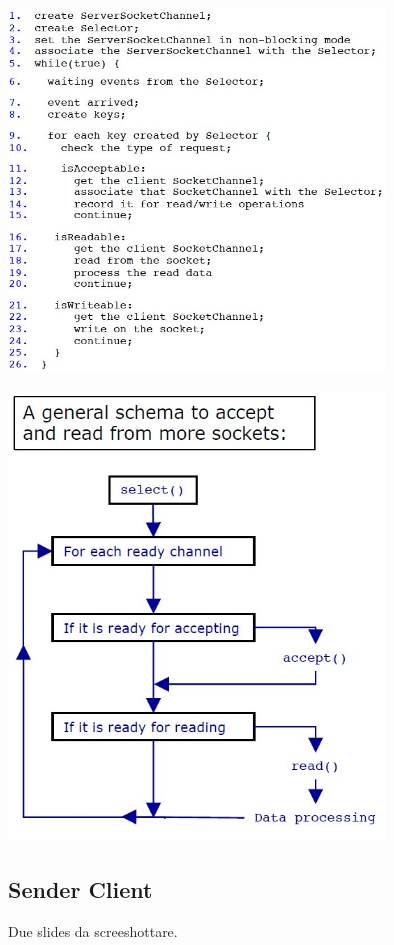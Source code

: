 \begin{center}
    \includegraphics[width=0.75\textwidth]{img/ConcurrentServerStructure1.jpg}
\end{center}

\begin{center}
    \includegraphics[width=0.75\textwidth]{img/ConcurrentServerStructure2.jpg}
\end{center}

\subsection{Sender Client}
Due slides da screeshottare.

